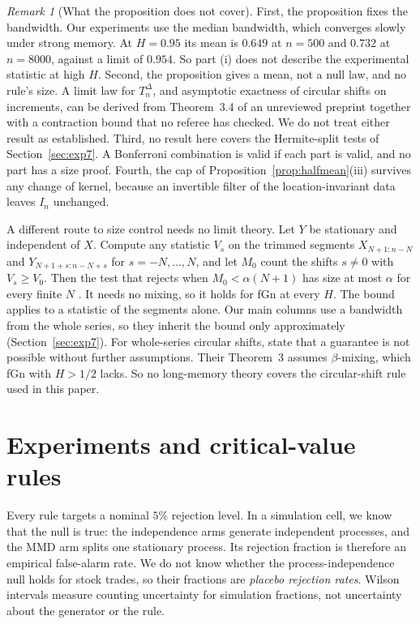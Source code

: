 \documentclass[11pt]{article}
\theoremstyle{remark}
\newtheorem{remark}{Remark}
\begin{document}
\begin{remark}[What the proposition does not cover]\label{rem:memkernel}
First, the proposition fixes the bandwidth. Our experiments use the median bandwidth, which converges slowly under strong memory. At $H=0.95$ its mean is $0.649$ at $n=500$ and $0.732$ at $n=8000$, against a limit of $0.954$. So part (i) does not describe the experimental statistic at high $H$. Second, the proposition gives a mean, not a null law, and no rule's size. A limit law for $T_n^\Delta$, and asymptotic exactness of circular shifts on increments, can be derived from Theorem~3.4 of an unreviewed preprint \citep{duker2025fourthmoment} together with a contraction bound that no referee has checked. We do not treat either result as established. Third, no result here covers the Hermite-split tests of Section~\ref{sec:exp7}. A Bonferroni combination is valid if each part is valid, and no part has a size proof. Fourth, the cap of Proposition~\ref{prop:halfmean}(iii) survives any change of kernel, because an invertible filter of the location-invariant data leaves $I_n$ unchanged.

A different route to size control needs no limit theory. Let $Y$ be stationary and independent of $X$. Compute any statistic $V_s$ on the trimmed segments $X_{N+1:n-N}$ and $Y_{N+1+s:n-N+s}$ for $s=-N,\ldots,N$, and let $M_0$ count the shifts $s\ne0$ with $V_s\ge V_0$. Then the test that rejects when $M_0<\alpha(N+1)$ has size at most $\alpha$ for every finite $N$ \citep[Corollary]{harris2020shift}. It needs no mixing, so it holds for fGn at every $H$. The bound applies to a statistic of the segments alone. Our main columns use a bandwidth from the whole series, so they inherit the bound only approximately (Section~\ref{sec:exp7}). For whole-series circular shifts, \citet[Section~4.2]{liang2025timeshift} state that a guarantee is not possible without further assumptions. Their Theorem~3 assumes $\beta$-mixing, which fGn with $H>1/2$ lacks. So no long-memory theory covers the circular-shift rule used in this paper.
\end{remark}

\section{Experiments and critical-value rules}\label{sec:methods}
Every rule targets a nominal $5\%$ rejection level. In a simulation cell, we know that the null is true: the independence arms generate independent processes, and the MMD arm splits one stationary process. Its rejection fraction is therefore an empirical false-alarm rate. We do not know whether the process-independence null holds for stock trades, so their fractions are \emph{placebo rejection rates}. Wilson intervals measure counting uncertainty for simulation fractions, not uncertainty about the generator or the rule.
\end{document}
